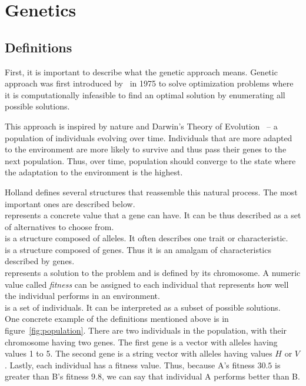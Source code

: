 \section{Genetics}\label{sec:genetics}

\subsection{Definitions}\label{subsec:definitions}

First, it is important to describe what the genetic approach means.
Genetic approach was first introduced by~\cite{hollandAdaptationNaturalArtificial1975} in 1975
to solve optimization problems where it is computationally infeasible to
find an optimal solution by enumerating all possible solutions.

This approach is inspired by nature and Darwin’s Theory of Evolution~\cite{TODO}
– a population of individuals evolving over time.
Individuals that are more adapted to the environment are
more likely to survive and thus pass their genes to the next population.
Thus, over time, population should converge to the state where the adaptation to the environment is the highest.

Holland defines several structures that reassemble this natural process.
The most important ones are described below.\\

 represents a concrete value that a gene can have.
It can be thus described as a set of alternatives to choose from. \\

 is a structure composed of alleles.
It often describes one trait or characteristic. \\

 is a structure composed of genes.
Thus it is an amalgam of characteristics described by genes.\\

 represents a solution to the problem and is defined by its chromosome.
A numeric value called \textit{fitness} can be assigned to each individual that represents how well the individual performs in an environment. \\

 is a set of individuals.
It can be interpreted as a subset of possible solutions.\\

One concrete example of the definitions mentioned above is in figure~\ref{fig:population}.
There are two individuals in the population, with their chromosome having two genes.
The first gene is a vector with alleles having values 1 to 5. The second gene is a string vector
with alleles having values $H$ or $V$. Lastly, each individual has a fitness value.
Thus, because A’s fitness $30.5$ is greater than B’s fitness $9.8$, we can say
that individual A performs better than B.


